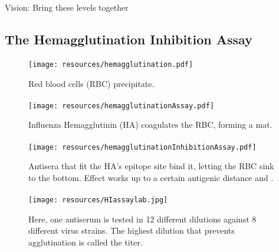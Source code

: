 \documentclass{beamer}
\begin{document}
\begin{darkframes}
\begin{frame}{\secname}
      \Large Vision: Bring these levels together
    \end{frame}




    \subsection{The Hemagglutination Inhibition Assay}

    \begin{frame}{\subsecname}
      \framesubtitle{}
      \begin{figure}
        \texttt{[image: resources/hemagglutination.pdf]}
        \caption{Red blood cells (RBC) precipitate.}
        \label{1}
      \end{figure}
    \end{frame}

    \begin{frame}{\subsecname}
      \framesubtitle{}
      \begin{figure}
        \texttt{[image: resources/hemagglutinationAssay.pdf]}
        \caption{Influenza Hemagglutinin (HA) coagulates the RBC, forming a mat.}
      \end{figure}
    \end{frame}

    \begin{frame}{\subsecname}
      \framesubtitle{}
      \begin{figure}
        \texttt{[image: resources/hemagglutinationInhibitionAssay.pdf]}
        \caption{Antisera that fit the HA's epitope site bind it, letting the RBC sink to the bottom. Effect works up to a certain antigenic distance and .}
      \end{figure}
    \end{frame}

    \begin{frame}{\subsecname}
      \framesubtitle{}
      \begin{figure}
        \texttt{[image: resources/HIassaylab.jpg]}
        \caption{\footnotesize Here, one antiserum is tested in 12 different dilutions against 8 different virus strains. The highest dilution that prevents agglutination is called the titer.}
      \end{figure}
    \end{frame}


\end{darkframes}
\end{document}
